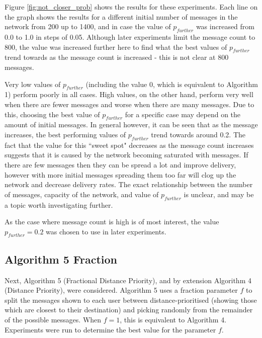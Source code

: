 \documentclass[bsc,frontabs,twoside,singlespacing,parskip,deptreport]{infthesis}     %
\begin{document}
Figure \ref{fig:not_closer_prob} shows the results for these experiments. Each line on the graph shows the results for a different initial number of messages in the network from 200 up to 1400, and in case the value of $p_{further}$ was increased from 0.0 to 1.0 in steps of 0.05. Although later experiments limit the message count to 800, the value was increased further here to find what the best values of $p_{further}$ trend towards as the message count is increased - this is not clear at 800 messages.

Very low values of $p_{further}$ (including the value 0, which is equivalent to Algorithm 1) perform poorly in all cases. High values, on the other hand, perform very well when there are fewer messages and worse when there are many messages. Due to this, choosing the best value of $p_{further}$ for a specific case may depend on the amount of initial messages. In general however, it can be seen that as the message increases, the best performing values of $p_{further}$ trend towards around 0.2. The fact that the value for this ``sweet spot" decreases as the message count increases suggests that it is caused by the network becoming saturated with messages. If there are few messages then they can be spread a lot and improve delivery, however with more initial messages spreading them too far will clog up the network and decrease delivery rates. The exact relationship between the number of messages, capacity of the network, and value of $p_{further}$ is unclear, and may be a topic worth investigating further.

As the case where message count is high is of most interest, the value $p_{further}=0.2$ was chosen to use in later experiments.


\subsection{Algorithm 5 Fraction}  \label{subsec:algorithm_5_fraction}
Next, Algorithm 5 (Fractional Distance Priority), and by extension Algorithm 4 (Distance Priority), were considered. Algorithm 5 uses a fraction parameter $f$ to split the messages shown to each user between distance-prioritised (showing those which are closest to their destination) and picking randomly from the remainder of the possible messages. When $f=1$, this is equivalent to Algorithm 4. Experiments were run to determine the best value for the parameter $f$.
\end{document}
